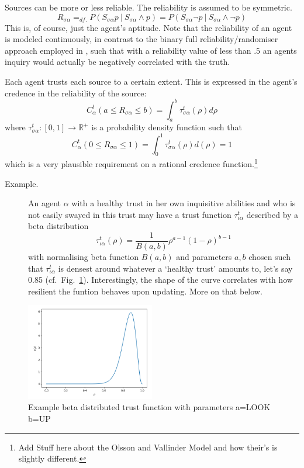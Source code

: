 \documentclass[11pt, a4paper]{article}
\newcommand{\Ssa}{S_{\sigma\alpha}}
\newcommand{\sa}{{\sigma\alpha}}
\newcommand{\given}[1][]{\:#1\vert\:}
\begin{document}
Sources can be more or less reliable. The reliability is assumed to be symmetric.
\[ 
R_{\sigma \alpha} =_{df.} P(\Ssa p \given \Ssa \land p) = P(\Ssa \neg p \given \Ssa \land \neg p)
\]
This is, of course, just the agent's aptitude. Note that the reliability of an agent is modeled continuously, in contrast to the binary full reliability/randomiser approach employed in \textcite[Chp. 3]{Bovens2003}, such that with a reliability value of less than $.5$ an agents inquiry would actually be negatively correlated with the truth.

Each agent trusts each source to a certain extent. This is expressed in the agent's credence in the reliability of the source:
\[ 
    C^t_{\alpha}(a \leqslant R_{\sa} \leqslant b) = \int_a^b \tau^t_{\sa}(\rho) d\rho
\]
where $\tau^t_{\sa}: [0,1] \rightarrow \mathbb{R}^+$ is a probability density function such that 
\[
    C^t_{\alpha}(0 \leqslant R_{\sa} \leqslant 1) =  \int_0^1 \tau^t_{\sa} (\rho) d(\rho) = 1
\]which is a very plausible requirement on a rational credence function.\footnote{Add Stuff here about the Olsson and Vallinder Model and how their's is slightly different.}

\begin{description}
    \item[Example.] An agent $\alpha$ with a healthy trust in her own inquisitive abilities and who is not easily swayed in this trust may have a trust function $\tau^t_{\iota\alpha}$ described by a beta distribution
\[
    \tau^t_{\iota\alpha} (\rho) = \frac{1}{B(a,b)} \rho^{a - 1} {(1 - \rho)}^{b-1}
\]
with normalising beta function $B(a,b)$ and parameters $a, b$ chosen such that $\tau^t_{\iota\alpha}$ is densest around whatever a `healthy trust' amounts to, let's say 0.85 (cf.~Fig.~\ref{fig:trf}). Interestingly, the shape of the curve correlates with how resilient the funtion behaves upon updating. More on that below.
\end{description}

\begin{figure}[ht]
	\centering
    \includegraphics[width=0.5\textwidth]{Figure_1.png}
	\caption{Example beta distributed trust function with parameters a=LOOK b=UP }
    \label{fig:trf}
\end{figure}
\end{document}
